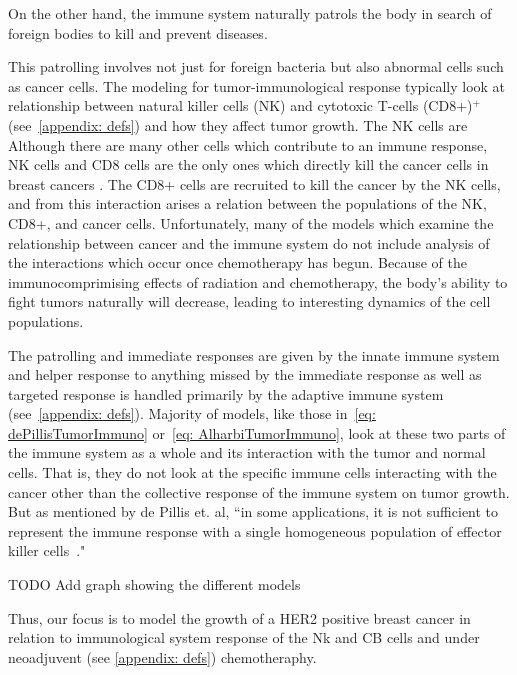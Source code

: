 \documentclass[11pt]{amsart}
\begin{document}
On the other hand, the immune system naturally patrols the body in search of foreign bodies to kill and prevent diseases.

This patrolling involves not just for foreign bacteria but also abnormal cells such as cancer cells. 
The modeling for tumor-immunological response typically look at relationship between natural killer cells (NK) and cytotoxic T-cells (CD8+)$^+$ (see\ \ref{appendix: defs}) and how they affect tumor growth. The NK cells are Although there are many other cells which contribute to an immune response, NK cells and CD8 cells are the only ones which directly kill the cancer cells in breast cancers \cite{Amens21}. The CD8+ cells are recruited to kill the cancer by the NK cells, and from this interaction arises a relation between the populations of the NK, CD8+, and cancer cells. 
Unfortunately, many of the models which examine the relationship between cancer and the immune system do not include analysis of the interactions which occur once chemotherapy has begun. Because of the immunocomprimising effects of radiation and chemotherapy, the body's ability to fight tumors naturally will decrease, leading to interesting dynamics of the cell populations.

The patrolling and immediate responses are given by the innate immune system and helper response to anything missed by the immediate response as well as targeted response is handled primarily by the adaptive immune system (see\ \ref{appendix: defs}).
Majority of models, like those in\ \ref{eq: dePillisTumorImmuno} or\ \ref{eq: AlharbiTumorImmuno}, look at these two parts of the immune system as  a whole and its interaction with the tumor and normal cells.
That is, they do not look at the specific immune cells interacting with the cancer other than the collective response of the immune system on tumor growth.
But as mentioned by de Pillis et. al, ``in some applications, it is not sufficient to represent the immune response with a single homogeneous population of
effector killer cells\ \cite{dePillis2014461}."


TODO Add graph showing the different models

Thus, our focus is to model the growth of a HER2 positive breast cancer in relation to immunological system response of the Nk and CB cells and under neoadjuvent (see \ref{appendix: defs}) chemotheraphy.
\end{document}

